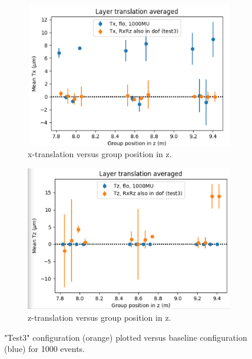 \begin{figure}
  \centering
  \begin{subfigure}[b]{0.4\textwidth}
    \centering
    \includegraphics[width=\textwidth]{plots/july_28/Tx.png}
    \caption{x-translation versus group position in z.}
    \label{fig:TxZ_1}
  \end{subfigure}
  \hfill
  \begin{subfigure}[b]{0.4\textwidth}
    \centering
    \includegraphics[width=\textwidth]{plots/july_28/Tz.png}
    \caption{z-translation versus group position in z.}
    \label{fig:TxZ_2}
  \end{subfigure}
  \caption{"Test3" configuration (orange) plotted versus baseline configuration (blue) for 1000 events.}
  \label{fig:TxZ}
\end{figure}

